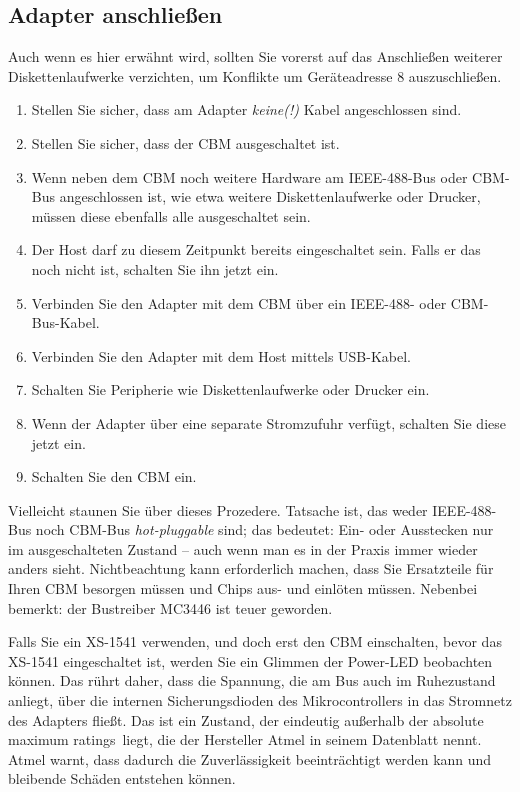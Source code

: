 \documentclass[10pt,a4paper]{scrartcl}		%
\begin{document}
\subsection{Adapter anschließen}
Auch wenn es hier erwähnt wird, sollten Sie vorerst auf das Anschließen
weiterer Diskettenlaufwerke verzichten, um Konflikte um Geräteadresse 8
auszuschließen.
\begin{enumerate}
\item Stellen Sie sicher, dass am Adapter \textit{keine(!)} Kabel angeschlossen sind.
\item Stellen Sie sicher, dass der CBM ausgeschaltet ist.
\item Wenn neben dem CBM noch weitere Hardware am IEEE-488-Bus oder CBM-Bus
angeschlossen ist, wie etwa weitere Diskettenlaufwerke oder Drucker,
müssen diese ebenfalls alle ausgeschaltet sein.
\item Der Host darf zu diesem Zeitpunkt bereits eingeschaltet sein. Falls er das noch nicht ist, schalten Sie ihn jetzt ein.
\item Verbinden Sie den Adapter mit dem CBM über ein IEEE-488- oder CBM-Bus-Kabel.
\item Verbinden Sie den Adapter mit dem Host mittels USB-Kabel.
\item Schalten Sie Peripherie wie Diskettenlaufwerke oder Drucker ein.
\item Wenn der Adapter über eine separate Stromzufuhr verfügt, schalten Sie diese jetzt ein.
\item Schalten Sie den CBM ein.
\end{enumerate}

Vielleicht staunen Sie über dieses Prozedere. Tatsache ist, das weder
IEEE-488-Bus noch CBM-Bus \textit{hot-pluggable} sind; das bedeutet:
Ein- oder Ausstecken nur im ausgeschalteten Zustand -- auch wenn man es in
der Praxis immer wieder anders sieht. Nichtbeachtung kann erforderlich
machen, dass Sie Ersatzteile für Ihren CBM besorgen müssen und Chips
aus- und einlöten müssen. Nebenbei bemerkt: der Bustreiber MC3446 ist
teuer geworden.

Falls Sie ein XS-1541 verwenden, und doch erst den CBM einschalten, bevor
das XS-1541 eingeschaltet ist, werden Sie ein Glimmen der Power-LED
beobachten können. Das rührt daher, dass die Spannung, die am Bus auch im
Ruhezustand anliegt, über die internen Sicherungsdioden des Mikrocontrollers
in das Stromnetz des Adapters fließt. Das ist ein Zustand, der
eindeutig außerhalb der \glqq absolute maximum ratings\grqq\ liegt,
die der Hersteller Atmel in seinem Datenblatt nennt. Atmel warnt,
dass dadurch die Zuverlässigkeit beeinträchtigt werden kann und bleibende
Schäden entstehen können. 
\end{document}
